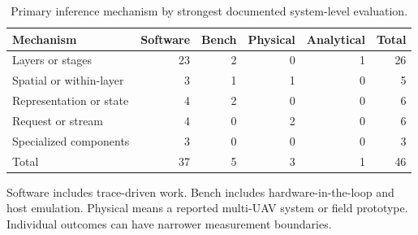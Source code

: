 \begin{table}[tbp]
\caption{Primary inference mechanism by strongest documented system-level evaluation.}\label{tab:settings}
\centering\small\setlength{\tabcolsep}{4pt}
\begin{tabular}{@{}p{.31\linewidth}rrrrr@{}}
\toprule
Mechanism & Software & Bench & Physical & Analytical & Total \\
\midrule
Layers or stages & 23 & 2 & 0 & 1 & 26 \\
Spatial or within-layer & 3 & 1 & 1 & 0 & 5 \\
Representation or state & 4 & 2 & 0 & 0 & 6 \\
Request or stream & 4 & 0 & 2 & 0 & 6 \\
Specialized components & 3 & 0 & 0 & 0 & 3 \\
Total & 37 & 5 & 3 & 1 & 46 \\
\bottomrule
\end{tabular}
\par\smallskip\raggedright Software includes trace-driven work. Bench includes hardware-in-the-loop and host emulation. Physical means a reported multi-UAV system or field prototype. Individual outcomes can have narrower measurement boundaries.
\end{table}

